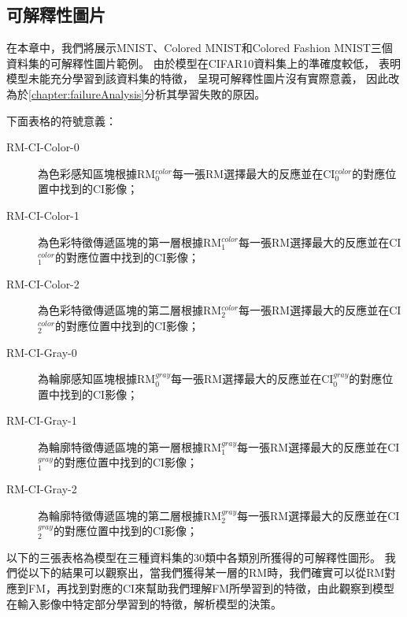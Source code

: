 \documentclass[class=NCU\_thesis, crop=false]{standalone}
\begin{document}
    \pagebreak
    \subsection{可解釋性圖片}
    在本章中，我們將展示MNIST、Colored MNIST和Colored Fashion MNIST三個資料集的可解釋性圖片範例。
    由於模型在CIFAR10資料集上的準確度較低，
    表明模型未能充分學習到該資料集的特徵，
    呈現可解釋性圖片沒有實際意義，
    因此改為於\cref{chapter:failureAnalysis}分析其學習失敗的原因。

    下面表格的符號意義：
    \begin{description}
        \item[RM-CI-Color-0] 為色彩感知區塊根據RM$^{color}_{0}$每一張RM選擇最大的反應並在CI$^{color}_{0}$的對應位置中找到的CI影像；
        \item[RM-CI-Color-1] 為色彩特徵傳遞區塊的第一層根據RM$^{color}_{1}$每一張RM選擇最大的反應並在CI$^{color}_{1}$的對應位置中找到的CI影像；
        \item[RM-CI-Color-2] 為色彩特徵傳遞區塊的第二層根據RM$^{color}_{2}$每一張RM選擇最大的反應並在CI$^{color}_{2}$的對應位置中找到的CI影像；

        \item[RM-CI-Gray-0] 為輪廓感知區塊根據RM$^{gray}_{0}$每一張RM選擇最大的反應並在CI$^{gray}_{0}$的對應位置中找到的CI影像；
        \item[RM-CI-Gray-1] 為輪廓特徵傳遞區塊的第一層根據RM$^{gray}_{1}$每一張RM選擇最大的反應並在CI$^{gray}_{1}$的對應位置中找到的CI影像；
        \item[RM-CI-Gray-2] 為輪廓特徵傳遞區塊的第二層根據RM$^{gray}_{2}$每一張RM選擇最大的反應並在CI$^{gray}_{2}$的對應位置中找到的CI影像；
    \end{description}
    以下的三張表格為模型在三種資料集的30類中各類別所獲得的可解釋性圖形。
    我們從以下的結果可以觀察出，當我們獲得某一層的RM時，我們確實可以從RM對應到FM，再找到對應的CI來幫助我們理解FM所學習到的特徵，由此觀察到模型在輸入影像中特定部分學習到的特徵，解析模型的決策。
    \pagebreak
\end{document}
